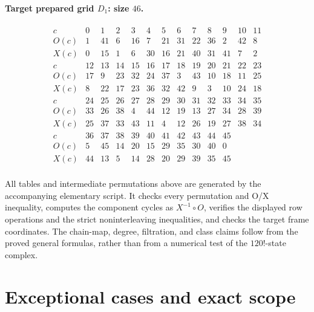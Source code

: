 \documentclass[11pt,a4paper]{article}
\theoremstyle{remark}
\begin{document}
\paragraph{Target prepared grid $D_1$: size $46$.}\mbox{}
\[
\begin{array}{c|rrrrrrrrrrrr}
c&0&1&2&3&4&5&6&7&8&9&10&11\\
O(c)&1&41&6&16&7&21&31&22&36&2&42&8\\
X(c)&0&15&1&6&30&16&21&40&31&41&7&2\\
\hline
c&12&13&14&15&16&17&18&19&20&21&22&23\\
O(c)&17&9&23&32&24&37&3&43&10&18&11&25\\
X(c)&8&22&17&23&36&32&42&9&3&10&24&18\\
\hline
c&24&25&26&27&28&29&30&31&32&33&34&35\\
O(c)&33&26&38&4&44&12&19&13&27&34&28&39\\
X(c)&25&37&33&43&11&4&12&26&19&27&38&34\\
\hline
c&36&37&38&39&40&41&42&43&44&45&&\\
O(c)&5&45&14&20&15&29&35&30&40&0&&\\
X(c)&44&13&5&14&28&20&29&39&35&45&&\\
\end{array}
\]

All tables and intermediate permutations above are generated by the
accompanying elementary script.  It checks every permutation and
O/X inequality, computes the component cycles as
$X^{-1}\circ O$, verifies the displayed row operations and the
strict noninterleaving inequalities, and checks the target frame
coordinates.  The chain-map, degree, filtration, and class claims
follow from the proved general formulas, rather than from a numerical
test of the $120!$-state complex.

\section{Exceptional cases and exact scope}
\label{sec:exceptions}
\end{document}
